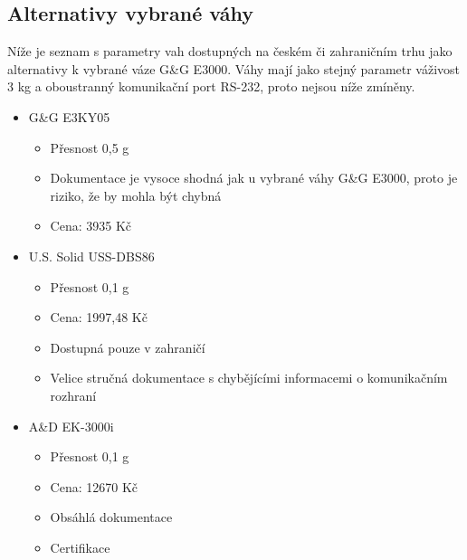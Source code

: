 \subsection{Alternativy vybrané váhy}
Níže je seznam s parametry vah dostupných na českém či zahraničním trhu jako alternativy k vybrané váze G\&G E3000. Váhy mají jako stejný parametr váživost 3 kg a oboustranný komunikační port RS-232, proto nejsou níže zmíněny.
\begin{itemize}
    
    \item G\&G E3KY05
    \begin{itemize}
        \item Přesnost 0,5 g
        \item Dokumentace je vysoce shodná jak u vybrané váhy G\&G E3000, proto je riziko, že by mohla být chybná
        \item Cena: 3935 Kč
    \end{itemize}
    
    \item U.S. Solid USS-DBS86
    \begin{itemize}
        \item Přesnost 0,1 g
        \item Cena: 1997,48 Kč
        \item Dostupná pouze v zahraničí
        \item Velice stručná dokumentace s chybějícími informacemi o komunikačním rozhraní
    \end{itemize}
    
    \item A\&D EK-3000i
    \begin{itemize}
        \item Přesnost 0,1 g
        \item Cena: 12670 Kč
        \item Obsáhlá dokumentace
        \item Certifikace
    \end{itemize} %
\end{itemize}






